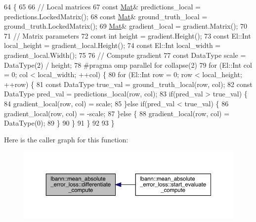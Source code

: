 \begin{DoxyCode}
64                                                                            \{
65 
66   \textcolor{comment}{// Local matrices}
67   \textcolor{keyword}{const} \hyperlink{base_8hpp_a68f11fdc31b62516cb310831bbe54d73}{Mat}& predictions\_local = predictions.LockedMatrix();
68   \textcolor{keyword}{const} \hyperlink{base_8hpp_a68f11fdc31b62516cb310831bbe54d73}{Mat}& ground\_truth\_local = ground\_truth.LockedMatrix();
69   \hyperlink{base_8hpp_a68f11fdc31b62516cb310831bbe54d73}{Mat}& gradient\_local = gradient.Matrix();
70 
71   \textcolor{comment}{// Matrix parameters}
72   \textcolor{keyword}{const} \textcolor{keywordtype}{int} height = gradient.Height();
73   \textcolor{keyword}{const} El::Int local\_height = gradient\_local.Height();
74   \textcolor{keyword}{const} El::Int local\_width = gradient\_local.Width();
75 
76   \textcolor{comment}{// Compute gradient}
77   \textcolor{keyword}{const} DataType scale = DataType(2) / height;
78 \textcolor{preprocessor}{  #pragma omp parallel for collapse(2)}
79   \textcolor{keywordflow}{for} (El::Int col = 0; col < local\_width; ++col) \{
80     \textcolor{keywordflow}{for} (El::Int row = 0; row < local\_height; ++row) \{
81       \textcolor{keyword}{const} DataType true\_val = ground\_truth\_local(row, col);
82       \textcolor{keyword}{const} DataType pred\_val = predictions\_local(row, col);
83       \textcolor{keywordflow}{if}(pred\_val > true\_val) \{
84         gradient\_local(row, col) = scale;
85       \}\textcolor{keywordflow}{else} \textcolor{keywordflow}{if}(pred\_val < true\_val) \{
86         gradient\_local(row, col) = -scale;
87       \}\textcolor{keywordflow}{else} \{
88         gradient\_local(row, col) = DataType(0);
89       \}
90     \}
91   \}
92 
93 \}
\end{DoxyCode}
Here is the caller graph for this function\+:\nopagebreak
\begin{figure}[H]
\begin{center}
\leavevmode
\includegraphics[width=350pt]{classlbann_1_1mean__absolute__error__loss_af1d8c8bacc959273f9f54eafbe5c1f7d_icgraph}
\end{center}
\end{figure}
\mbox{\label{classlbann_1_1mean__absolute__error__loss_a0b6518199e86abc197e811f0a1ff7868}} 
